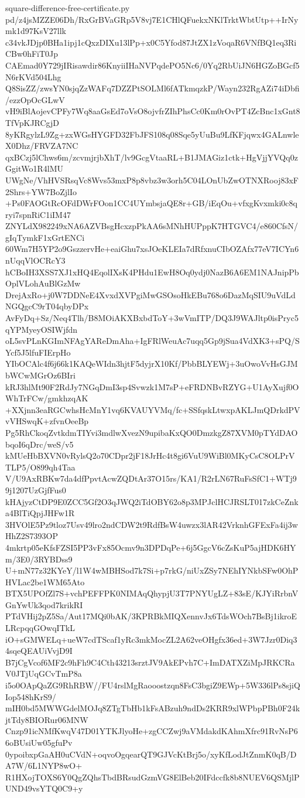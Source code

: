 \documentclass[11pt]{article}
\theoremstyle{definition}
\theoremstyle{remark}
\begin{document}
\begin{filecontents*}[overwrite]{square-difference-free-certificate.py}
pd/z4jsMZZE06Dh/RxGrBVaGRp5V8vj7E1CHlQFuekxNKlTrktWbtUtp++IrNymk1d97KsV27llk
c34vkJDjp0BHa1ipj1cQxzDIXu13lPp+x0C5Yfod87JtZX1zVoqaR6VNfBQ1eq3RiCBw0hFiT0Jp
CAEmad0Y729jIRisawdir86KnyiiIHaNVPqdePO5Nc6/0Yq2RbUiJN6HGZoBGcf5N6rKVd504Lhg
Q8SisZZ/zwsYN0sjqZzWAFq7DZZPtSOLMl6fATkmqzkP/Wayn232RgAZi74iDbfi/ezzOpOcGLwV
vH9iBlAojevCPFy7Wq8aaGsEd7oVsO8ojvfrZIhPhsCc0Km0rOvPT4ZcBnc1xGnt8TfVpKJRCgjD
8yKRgylzL9Zg+zxWGsHYGFD32FbJFS108q08Sqe5yUuBu9LfKFjqwx4GALnwleX0Dhz/FRVZA7NC
qxBCzj5lChws6m/zcvmjrjbXhT/lv9GcgVtaaRL+B1JMAGiz1ctk+HgVjjYVQq0zGgitWo1R4lMU
UWgNe/VhHVSRsqVc8Wvs53mxP8p8vbz3w3orh5C04LOnUbZwOTNXRooj83xF2Shrs+YW7BoZjlIo
+Ps0FAOGtRcOFdDWrFOon1CC4UYmbsjaQE8r+GB/iEqOu+vfxgKvxmki0c8qryi7spnRiC1iIM47
ZNYLdX982249xNA6AZVBsgHcxzpPkAA6sMNhHUPppK7HTGVC4/e860CfsN/gIqTymkF1xGrtENCi
60Wm7H5YP2o9GszzervHe+eaiGhu7xsJOeKLEIa7dRfxnuCIbOZAfx77eV7ICYn6nUqqVlOCRcY3
hCBoIH3XSS7XJ1xHQ4EqolIXsK4PHdu1EwH8Oq0ydj0NazB6A6EM1NAJnipPbOplVLohAuBlGzMw
DrejAxRo+j0W7DDNeE4XvxdXVPgiMwGSOsoHkEBu768o6DazMqSIU9uVdLdNGQgcC9rT04qbyDPx
AvFyDq+Sz/Neq4Tlh/B8MOiAKXBxbdToY+3wVmITP/DQ3J9WAJltp0isPryc5qYPMyeyOSIWjfdn
oL5svPLnKGImNFAgYAReDmAha+IgFRlWeuAc7uqq5Gp9jSua4VdXK3+sPQ/SYcf5J5lfuFIErpHo
YIbOCAlc4f6j66k1KAQeWIdn3hjtF5dyjrX10Kf/PbbBLYEWj+3uOwoVvHsGJMbWCwMGrOz6BIri
kRJ3hlMt90F2RdJy7NGqDmI3sp4Svwzk1M7sP+eFRDNBvRZYG+U1AyXujf0OWhTrFCw/gmkhzqAK
+XXjnn3eaRGCwhsHcMnY1vq6KVAUYVMq/fc+SSfqskLtwxpAKLJmQDrkdPVvVHSwqK+zfvnOeeBp
Pg5RhCkoqZvtkdmTIYvi3mdlwXvezN9upibaKxQO0DmzkgZ87XVM0pTYdDAObqoI6qDrc/weS/v5
kMUeHbBXVN0vRylsQ2o70CDpr2jF18JrHc4t8gi6VuU9WiBl0MKyCsC8OLPrVTLP5/O899qh4Taa
V/U9AxRBKw7da4dfPpvtAcwZQDtAr37O15rs/KA1/R2rLN67RuFsSfC1+WTj99j1207UzGjfFus0
kHAjyzCtDP9E0ZCC5Gf2O3qJWQ2iTdOBY62o8p3MPJclHCJRSLT017zkCeZnka4BlTiQpjJHFw1R
3HVOlE5Pz9tloz7Usv49lro2ndCDW2t9RdfBsW4uwzx3lAR42VrknhGFExFa4ij3wHhZ2S7393OP
4mkrtp05eKfsFZSI5PP3vFx85Ocmv9n3DPDqPe+6j5GgcV6cZsKuP5ajHDK6HYm/3E0/3RYBDss9
U+mN77z32KYeY/l1W4wMBHSod7k7Si+p7rkG/niUxZSy7NEhIYNkbSFw0OhPHVLac2be1WM65Ato
BTX5UPOfZl7S+vchPEFFPK0NIMAqQhypjU3T7PNYUgLZ+83sE/KJYiRrbnVGnYwUk3qod7krikRI
PTdVHij2pZ5Sa/Aut17MQi0bAK/3KPRBkMIQXennvJx6TdsWOch7BsBj1ikroELRcpqqGOwqITkL
iO+sGMWELq+ueW7cdTScaf1yRc3mkMocZL2A62veOHgfx36ed+3W7Jzr0Diq34sqeQEAUiVvjD9I
B7jCgVcof6MF2c9hFh9C4Cth43213srztJV9AkEPvh7C+ImDATXZiMpJRKCRaV0JTjUqGCvTmP8a
i5o0OApQaZG9RhRBW//FU4rslMgRaooostzqn8FsC3bgiZ9EWp+5W336lPs8sjiQIop548hKrS9/
mIH0bd5MWWGdelMOJq8ZTgTbHb1kFsABzuh9ndDs2KRR9xlWPbpPBh0F24kjtTdy8BIORur06MNW
Cnzp91icNMfKwqV47D01YTKJlyoHe+zgCCZwj9aVMdakdKAhmXfrc91RvNsP66oBUsiUw05gfuPv
0ypoibxpGaAH0uCVdN+oqvoOgqearQT9GJVcKtBrj5o/xyKfLodJtZnmK0qB/DA7W/6L1NYP8wO+
R1HXojTOXS6Y0QgZQhsTbdBRsudGzmVG8ElBeb20IFdccfk8b8NUEV6QSMjlPUND49vsYTQ0C9+y

\end{filecontents*}
\end{document}
